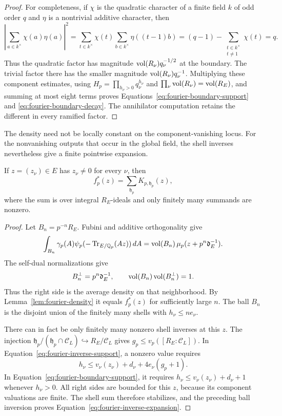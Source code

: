 \begin{proof}
For completeness, if $\chi$ is the quadratic character of a finite field
$k$ of odd order $q$ and $\eta$ is a nontrivial additive character, then
\[
 \left|\sum_{a\in k^\times}\chi(a)\eta(a)\right|^2
 =\sum_{t\in k^\times}\chi(t)
       \sum_{b\in k^\times}\eta((t-1)b)
 =(q-1)-\sum_{\substack{t\in k^\times\\t\ne1}}\chi(t)=q.
\]
Thus the quadratic factor has magnitude
$\operatorname{vol}(R_\nu)q_\nu^{-1/2}$ at the boundary.  The trivial factor there has
the smaller magnitude $\operatorname{vol}(R_\nu)q_\nu^{-1}$.  Multiplying these
component estimates, using $H_p=\prod_{h_\nu>0}q_\nu^{h_\nu}$ and
$\prod_\nu\operatorname{vol}(R_\nu)=\operatorname{vol}(R_E)$, and summing at most eight terms proves
Equations~\eqref{eq:fourier-boundary-support} and
\eqref{eq:fourier-boundary-decay}.  The annihilator computation retains the
different in every ramified factor.
\end{proof}

The density need not be locally constant on the component-vanishing locus.
For the nonvanishing outputs that occur in the global field, the shell
inverses nevertheless give a finite pointwise expansion.

\begin{lemma}\label{lem:fourier-inverse-expansion}
If $z=(z_\nu)\in E$ has $z_\nu\ne0$ for every $\nu$, then
\begin{equation}\label{eq:fourier-inverse-expansion}
 f_p^*(z)=\sum_{\mathfrak h_p}K_{p,\mathfrak h_p}(z),
\end{equation}
where the sum is over integral $R_E$-ideals and only finitely many summands
are nonzero.
\end{lemma}

\begin{proof}
Let $B_n=p^{-n}R_E$.  Fubini and additive orthogonality give
\[
 \int_{B_n}\gamma_p(A)\psi_p(-\operatorname{Tr}_{E/\mathbb Q_p}(Az))\,dA
       =\operatorname{vol}(B_n)\,\mu_p(z+p^n\mathfrak d_E^{-1}).
\]
The self-dual normalizations give
\[
 B_n^\perp=p^n\mathfrak d_E^{-1},\qquad
 \operatorname{vol}(B_n)\operatorname{vol}(B_n^\perp)=1.
\]
Thus the right side is the average density on that neighborhood.  By
Lemma~\ref{lem:fourier-density} it equals $f_p^*(z)$ for sufficiently large
$n$.  The ball $B_n$ is the disjoint union of the finitely many shells with
$h_\nu\le ne_\nu$.

There can in fact be only finitely many nonzero shell inverses at this $z$.
The injection
$\mathfrak h_p/(\mathfrak h_p\cap\mathcal C_L)\hookrightarrow R_E/\mathcal C_L$
gives $g_p\le v_p([R_E:\mathcal C_L])$.  In
Equation~\eqref{eq:fourier-inverse-support}, a nonzero value requires
\[
 h_\nu\le v_\nu(z_\nu)+d_\nu+4e_\nu(g_p+1).
\]
In Equation~\eqref{eq:fourier-boundary-support}, it requires
$h_\nu\le v_\nu(z_\nu)+d_\nu+1$ whenever $h_\nu>0$.
All right sides are bounded for this $z$, because its component valuations
are finite.  The shell sum therefore stabilizes, and the preceding ball
inversion proves Equation~\eqref{eq:fourier-inverse-expansion}.
\end{proof}

